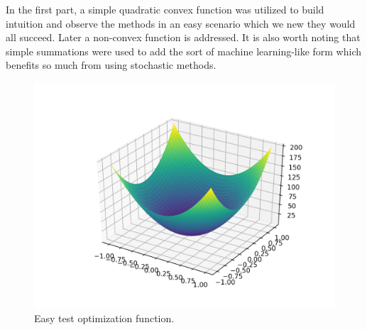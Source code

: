 \documentclass[twoside,11pt]{homework}
\DeclarePairedDelimiter{\2norm}{\lVert}{\rVert^2_2}
\newcommand{\1}[1]{\mathds{1}\left[#1\right]}
\begin{document}
\begin{enumerate}[\bf (i)]
    In the first part, a simple quadratic convex function was utilized to build
    intuition and observe the methods in an easy scenario which we new they
    would all succeed. Later a non-convex function is addressed. It is also
    worth noting that simple summations were used to add the sort of
    machine learning-like form which benefits so much from using stochastic
    methods.
       \begin{figure}[h!]
         \centering
         \includegraphics[width=6in]{img/easy-surface.png}
         \caption{Easy test optimization function.}
         \label{fig:surface}
       \end{figure}


\end{enumerate}
\end{document}
